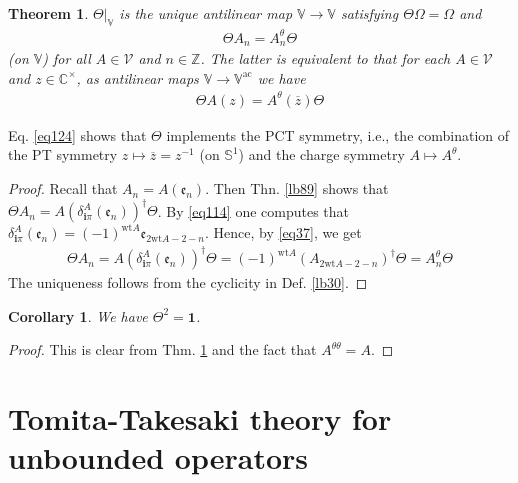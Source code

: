 \documentclass[12pt,b5paper,notitlepage]{article}
\theoremstyle{definition}
\theoremstyle{plain}
\newtheorem{thm}[df]{Theorem}
\newtheorem{co}[df]{Corollary}
\newcommand{\ovl}{\overline}
\newcommand{\idt}{\mathbf{1}}
\newcommand{\im}{\mathbf{i}}
\newcommand{\Vbb}{\mathbb V}
\newcommand{\Cbb}{\mathbb C}
\newcommand{\Zbb}{\mathbb Z}
\newcommand{\wt}{\mathrm{wt}}
\newcommand{\Sbb}{{\mathbb S}}
\newcommand{\ek}{\mathfrak{e}}
\newcommand{\ac}{\mathrm{ac}}
\newcommand{\MV}{\mathcal V}
\numberwithin{equation}{section}
\begin{document}
\subsection{}


\begin{thm}\label{lb90}
$\Theta|_\Vbb$ is the unique antilinear map $\Vbb\rightarrow\Vbb$ satisfying $\Theta\Omega=\Omega$ and
\begin{align}
\Theta A_n=A^\theta_n\Theta
\end{align}
(on $\Vbb$) for all $A\in\MV$ and $n\in\Zbb$. The latter is equivalent to that for each $A\in\MV$ and $z\in\Cbb^\times$, as antilinear maps $\Vbb\rightarrow\Vbb^\ac$ we have
\begin{align}\label{eq124}
\Theta A(z)=A^\theta(\ovl z)\Theta
\end{align}
\end{thm}

Eq. \eqref{eq124} shows that $\Theta$ implements the PCT symmetry, i.e., the combination of the PT symmetry $z\mapsto \ovl z=z^{-1}$ (on $\Sbb^1$) and the charge symmetry $A\mapsto A^\theta$.



\begin{proof}
Recall that $A_n=A(\ek_n)$. Then Thn. \ref{lb89} shows that $\Theta A_n=A(\delta^A_{\im\pi}(\ek_n))^\dagger\Theta$. By \eqref{eq114} one computes that $\delta^A_{\im\pi}(\ek_n)=(-1)^{\wt A}\ek_{2\wt A-2-n}$. Hence, by \eqref{eq37}, we get
\begin{align*}
\Theta A_n=A(\delta^A_{\im\pi}(\ek_n))^\dagger\Theta=(-1)^{\wt A}(A_{2\wt A-2-n})^\dagger\Theta=A^\theta_n\Theta
\end{align*}
The uniqueness follows from the cyclicity in Def. \ref{lb30}.
\end{proof}



\begin{co}
We have $\Theta^2=\idt$.
\end{co}

\begin{proof}
This is clear from Thm. \ref{lb90} and the fact that $A^{\theta\theta}=A$.
\end{proof}


\newpage



\section{Tomita-Takesaki theory for unbounded operators}
\end{document}
